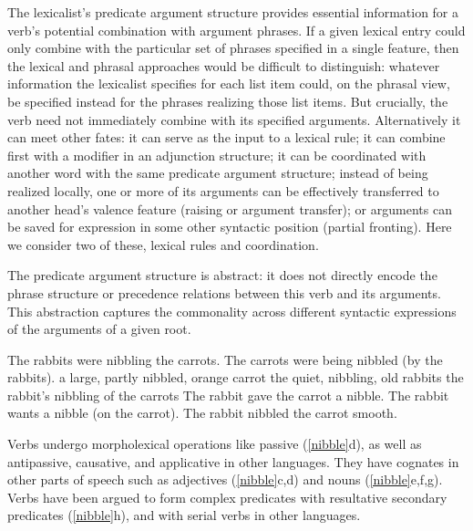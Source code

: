 \documentclass[output=paper]{langsci/langscibook}
\begin{document}
The lexicalist’s predicate argument structure provides essential information for a verb's potential
combination with argument phrases.   If a given lexical entry could only  combine with the particular set of phrases specified in a single \val feature, then the lexical and phrasal approaches would be difficult to distinguish: whatever information the lexicalist specifies for each \val list item could, on the phrasal view, be specified instead for the phrases realizing those list items.  
But crucially, the verb need not immediately combine with its specified
arguments.  Alternatively it can meet other fates: it can serve as the input to a lexical rule; it
can combine first with a modifier in an adjunction structure; it can be coordinated with another
word with the same predicate argument structure; instead of being realized locally, one or more of
its arguments can be effectively transferred to another head’s valence feature (raising or argument
transfer); or arguments can be saved for expression in some other syntactic position (partial
fronting).   Here we consider two of these, lexical rules and coordination.  
 
The predicate argument structure is abstract: it does not directly encode the phrase structure or
precedence relations between this verb and its arguments. This abstraction captures the commonality
across different syntactic expressions of the arguments of a given root.

\begin{exe}
\ex \label{nibble}
\begin{xlist}
\ex  The rabbits were nibbling the carrots.  
\ex  The carrots were being nibbled (by the rabbits).
\ex  a large, partly nibbled, orange carrot 
\ex  the quiet, nibbling, old rabbits
\ex  the rabbit's nibbling of the carrots
\ex  The rabbit gave the carrot a nibble.  
\ex  The rabbit wants a nibble (on the carrot).  
\ex  The rabbit nibbled the carrot smooth.
\end{xlist}
\end{exe}

\noindent
Verbs undergo  morpholexical operations like passive
(\ref{nibble}d), as well as antipassive, causative, and applicative in other languages.  They have cognates in
other parts of speech such as adjectives  (\ref{nibble}c,d) and nouns  (\ref{nibble}e,f,g).  
Verbs have been argued to form complex predicates with resultative secondary predicates (\ref{nibble}h), and with serial verbs in other languages.   
\end{document}
